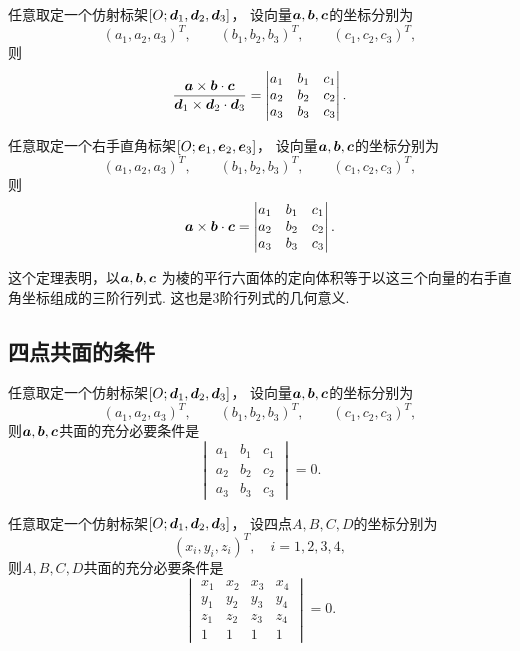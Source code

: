 \begin{theorem}
任意取定一个仿射标架\([O;\boldsymbol{d}_1,\boldsymbol{d}_2,\boldsymbol{d}_3]\)，
设向量\(\boldsymbol{a},\boldsymbol{b},\boldsymbol{c}\)的坐标分别为\[
	(a_1,a_2,a_3)^T, \qquad
	(b_1,b_2,b_3)^T, \qquad
	(c_1,c_2,c_3)^T,
\]
则\begin{equation}
	\frac{\boldsymbol{a}\times\boldsymbol{b}\cdot\boldsymbol{c}}{\boldsymbol{d}_1\times\boldsymbol{d}_2\cdot\boldsymbol{d}_3}
	= \begin{vmatrix}
		a_1 & b_1 & c_1 \\
		a_2 & b_2 & c_2 \\
		a_3 & b_3 & c_3
	\end{vmatrix}.
\end{equation}
\end{theorem}

\begin{theorem}
任意取定一个右手直角标架\([O;\boldsymbol{e}_1,\boldsymbol{e}_2,\boldsymbol{e}_3]\)，
设向量\(\boldsymbol{a},\boldsymbol{b},\boldsymbol{c}\)的坐标分别为\[
	(a_1,a_2,a_3)^T, \qquad
	(b_1,b_2,b_3)^T, \qquad
	(c_1,c_2,c_3)^T,
\]
则\begin{equation}
	\boldsymbol{a}\times\boldsymbol{b}\cdot\boldsymbol{c}
	= \begin{vmatrix}
		a_1 & b_1 & c_1 \\
		a_2 & b_2 & c_2 \\
		a_3 & b_3 & c_3
	\end{vmatrix}.
\end{equation}
\end{theorem}
这个定理表明，以\(\boldsymbol{a},\boldsymbol{b},\boldsymbol{c}\)
为棱的平行六面体的定向体积等于以这三个向量的右手直角坐标组成的三阶行列式.
这也是3阶行列式的几何意义.

\subsection{四点共面的条件}
\begin{theorem}
任意取定一个仿射标架\([O;\boldsymbol{d}_1,\boldsymbol{d}_2,\boldsymbol{d}_3]\)，
设向量\(\boldsymbol{a},\boldsymbol{b},\boldsymbol{c}\)的坐标分别为\[
	(a_1,a_2,a_3)^T, \qquad
	(b_1,b_2,b_3)^T, \qquad
	(c_1,c_2,c_3)^T,
\]
则\(\boldsymbol{a},\boldsymbol{b},\boldsymbol{c}\)共面的充分必要条件是\[
	\begin{vmatrix}
		a_1 & b_1 & c_1 \\
		a_2 & b_2 & c_2 \\
		a_3 & b_3 & c_3
	\end{vmatrix} = 0.
\]
\end{theorem}

\begin{corollary}
任意取定一个仿射标架\([O;\boldsymbol{d}_1,\boldsymbol{d}_2,\boldsymbol{d}_3]\)，
设四点\(A,B,C,D\)的坐标分别为\[
	(x_i,y_i,z_i)^T,
	\quad i=1,2,3,4,
\]
则\(A,B,C,D\)共面的充分必要条件是\[
	\begin{vmatrix}
		x_1 & x_2 & x_3 & x_4 \\
		y_1 & y_2 & y_3 & y_4 \\
		z_1 & z_2 & z_3 & z_4 \\
		1 & 1 & 1 & 1
	\end{vmatrix} = 0.
\]
\end{corollary}

